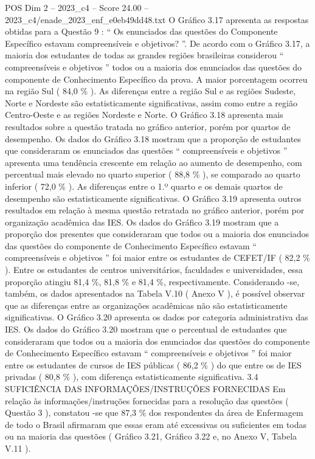 \begin{textsample}{POS Dim 2 – 2023\_c4 – Score 24.00 – 2023\_c4/enade\_2023\_enf\_e0eb49dd48.txt}
O Gráfico 3.17 apresenta as respostas obtidas para a Questão 9 : “ Os enunciados das questões do Componente Específico estavam compreensíveis e objetivos? ”.
De acordo com o Gráfico 3.17, a maioria dos estudantes de todas as grandes regiões brasileiras considerou “ compreensíveis e objetivos ” todos ou a maioria dos enunciados das questões do componente de Conhecimento Específico da prova.
A maior porcentagem ocorreu na região Sul ( 84,0 \% ).
As diferenças entre a região Sul e as regiões Sudeste, Norte e Nordeste são estatisticamente significativas, assim como entre a região Centro-Oeste e as regiões Nordeste e Norte.
O Gráfico 3.18 apresenta mais resultados sobre a questão tratada no gráfico anterior, porém por quartos de desempenho.
Os dados do Gráfico 3.18 mostram que a proporção de estudantes que consideraram os enunciados das questões “ compreensíveis e objetivos ” apresenta uma tendência crescente em relação ao aumento de desempenho, com percentual mais elevado no quarto superior ( 88,8 \% ), se comparado ao quarto inferior ( 72,0 \% ).
As diferenças entre o 1.º quarto e os demais quartos de desempenho são estatisticamente significativas.
O Gráfico 3.19 apresenta outros resultados em relação à mesma questão retratada no gráfico anterior, porém por organização acadêmica das IES.
Os dados do Gráfico 3.19 mostram que a proporção dos presentes que consideraram que todos ou a maioria dos enunciados das questões do componente de Conhecimento Específico estavam “ compreensíveis e objetivos ” foi maior entre os estudantes de CEFET/IF ( 82,2 \% ).
Entre os estudantes de centros universitários, faculdades e universidades, essa proporção atingiu 81,4 \%, 81,8 \% e 81,4 \%, respectivamente.
Considerando -se, também, os dados apresentados na Tabela V.10 ( Anexo V ), é possível observar que as diferenças entre as organizações acadêmicas não são estatisticamente significativas.
O Gráfico 3.20 apresenta os dados por categoria administrativa das IES.
Os dados do Gráfico 3.20 mostram que o percentual de estudantes que consideraram que todos ou a maioria dos enunciados das questões do componente de Conhecimento Específico estavam “ compreensíveis e objetivos ” foi maior entre os estudantes de cursos de IES públicas ( 86,2 \% ) do que entre os de IES privadas ( 80,8 \% ), com diferença estatisticamente significativa. 3.4 SUFICIÊNCIA DAS INFORMAÇÕES/INSTRUÇÕES FORNECIDAS Em relação às informações/instruções fornecidas para a resolução das questões ( Questão 3 ), constatou -se que 87,3 \% dos respondentes da área de Enfermagem de todo o Brasil afirmaram que essas eram até excessivas ou suficientes em todas ou na maioria das questões ( Gráfico 3.21, Gráfico 3.22 e, no Anexo V, Tabela V.11 ).

\end{textsample}
